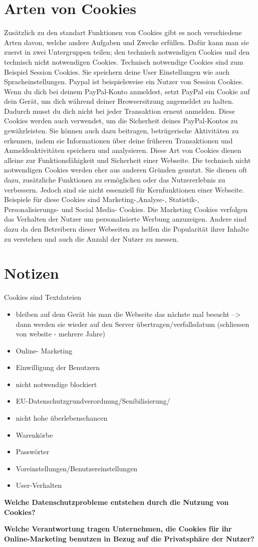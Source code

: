 \documentclass{article}
\begin{document}
\section{Arten von Cookies}
Zusätzlich zu den standart Funktionen von Cookies gibt es noch verschiedene Arten davon, welche andere Aufgaben und Zwecke erfüllen. Dafür kann man sie zuerst in zwei Untergruppen teilen; den technisch notwendigen Cookies und den technisch nicht notwendigen Cookies. 
Technisch notwendige Cookies sind zum Beispiel Session Cookies. Sie speichern deine User Einstellungen wie auch Spracheinstellungen. Paypal ist beispielsweise ein Nutzer von Session Cookies. Wenn du dich bei deinem PayPal-Konto anmeldest, setzt PayPal ein Cookie auf dein Gerät, um dich während deiner Browsersitzung angemeldet zu halten. Dadurch musst du dich nicht bei jeder Transaktion erneut anmelden.
Diese Cookies werden auch verwendet, um die Sicherheit deines PayPal-Kontos zu gewährleisten. Sie können auch dazu beitragen, betrügerische Aktivitäten zu erkennen, indem sie Informationen über deine früheren Transaktionen und Anmeldeaktivitäten speichern und analysieren. Diese Art von Cookies dienen alleine zur Funktionsfähigkeit und Sicherheit einer Webseite.
Die technisch nicht notwendigen Cookies werden eher aus anderen Gründen genutzt. Sie dienen oft dazu, zusätzliche Funktionen zu ermöglichen oder das Nutzererlebnis zu verbessern. Jedoch sind sie nicht essenziell für Kernfunktionen einer Webseite. Beispiele für diese Cookies sind Marketing-,Analyse-, Statistik-, Personalisierungs- und Social Media- Cookies. Die Marketing Cookies verfolgen das Verhalten der Nutzer um personalisierte Werbung anzuzeigen. Andere sind dazu da den Betreibern dieser Webseiten zu helfen die Popularität ihrer Inhalte zu verstehen und auch die Anzahl der Nutzer zu messen.


\section{Notizen}
Cookies sind Textdateien

    \begin{itemize}
        \renewcommand{\labelitemi}{$\rightarrow$}
\item bleiben auf dem Gerät bis man die Webseite das nächste mal besucht --> dann werden sie wieder auf den Server übertragen/verfallsdatum (schliessen von website - mehrere Jahre)

\item Online- Marketing
\item Einwilligung der Benutzern
\item nicht notwendige blockiert 
\item EU-Datenschutzgrundverordnung/Senibilisierung/
\item nicht hohe überlebenschancen

\item Warenkörbe
\item Passwörter
\item Voreinstellungen/Benutzereinstellungen
\item User-Verhalten

    \end{itemize}

\textbf{Welche Datenschutzprobleme entstehen durch die Nutzung von Cookies?}

\textbf{Welche Verantwortung tragen Unternehmen, die Cookies für ihr Online-Marketing benutzen in Bezug auf die Privatsphäre der Nutzer?}



\printbibliography
 
\end{document}
